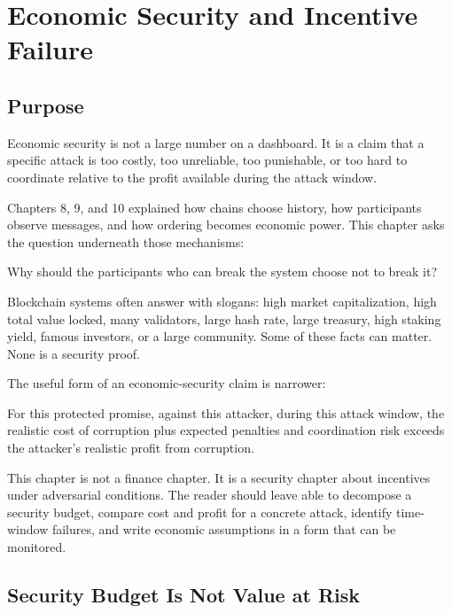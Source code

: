 \chapter{Economic Security and Incentive Failure}

\section{Purpose}

\begin{principlebox}
Economic security is not a large number on a dashboard. It is a claim that a specific attack is too costly, too unreliable, too punishable, or too hard to coordinate relative to the profit available during the attack window.
\end{principlebox}

Chapters 8, 9, and 10 explained how chains choose history, how participants observe messages, and how ordering becomes economic power. This chapter asks the question underneath those mechanisms:

\begin{codeblock}
Why should the participants who can break the system choose not to break it?
\end{codeblock}

Blockchain systems often answer with slogans: high market capitalization, high total value locked, many validators, large hash rate, large treasury, high staking yield, famous investors, or a large community. Some of these facts can matter. None is a security proof.

The useful form of an economic-security claim is narrower:

\begin{codeblock}
For this protected promise,
against this attacker,
during this attack window,
the realistic cost of corruption plus expected penalties and coordination risk
exceeds the attacker's realistic profit from corruption.
\end{codeblock}

This chapter is not a finance chapter. It is a security chapter about incentives under adversarial conditions. The reader should leave able to decompose a security budget, compare cost and profit for a concrete attack, identify time-window failures, and write economic assumptions in a form that can be monitored.

\section{Security Budget Is Not Value at Risk}

